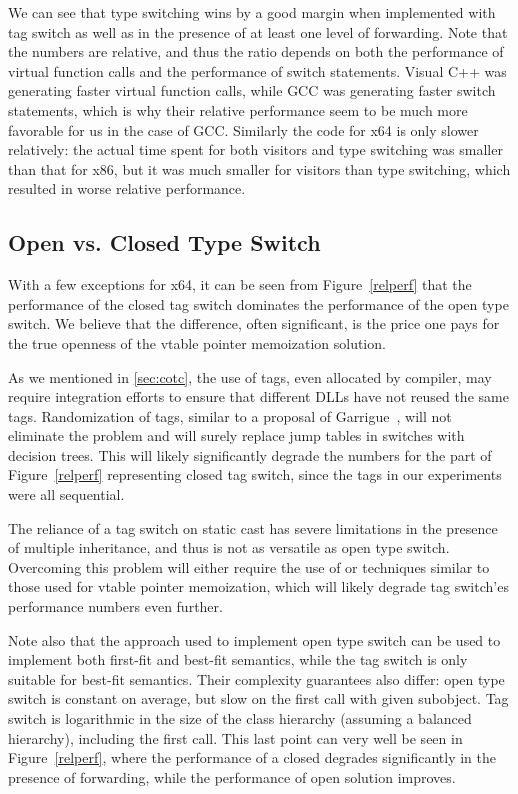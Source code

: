 We can see that type switching wins by a good margin when implemented with tag switch as 
well as in the presence of at least one level of forwarding. Note that the 
numbers are relative, and thus the ratio depends on both the performance of 
virtual function calls and the performance of switch statements. Visual C++ was 
generating faster virtual function calls, while GCC was generating faster switch 
statements, which is why their relative performance seem to be much more 
favorable for us in the case of GCC.
Similarly the code for x64 is only slower relatively: the actual time spent for 
both visitors and type switching was smaller than that for x86, but it was much 
smaller for visitors than type switching, which resulted in worse relative 
performance.

\subsection{Open vs. Closed Type Switch}
\label{sec:cmp}

With a few exceptions for x64, it can be seen from Figure~\ref{relperf} 
that the performance of the closed tag switch dominates the performance of the 
open type switch. We believe that the difference, often significant, is the 
price one pays for the true openness of the vtable pointer memoization solution. 

As we mentioned in \textsection\ref{sec:cotc}, the use of tags, even allocated 
by compiler, may require integration efforts to ensure that different DLLs have 
not reused the same tags. Randomization of tags, similar to a proposal of 
Garrigue~\cite{garrigue-98}, will not eliminate the problem and will surely 
replace jump tables in switches with decision trees. This will likely 
significantly degrade the numbers for the part of Figure~\ref{relperf} 
representing closed tag switch, since the tags in our experiments were all 
sequential. 

The reliance of a tag switch on static cast has severe limitations in the 
presence of multiple inheritance, and thus is not as versatile as open type 
switch. Overcoming this problem will either require the use of 
 or techniques similar to those used for vtable pointer 
memoization, which will likely degrade tag switch'es performance numbers even 
further.

Note also that the approach used to implement open type switch can be used to 
implement both first-fit and best-fit semantics, while the tag switch is only suitable 
for best-fit semantics. Their complexity guarantees also differ: open type 
switch is constant on average, but slow on the first call with given subobject. 
Tag switch is logarithmic in the size of the class hierarchy 
(assuming a balanced hierarchy), including the first call. This last point can 
very well be seen in Figure~\ref{relperf}, where the performance of a closed 
degrades significantly in the presence of forwarding, while the performance of 
open solution improves.

